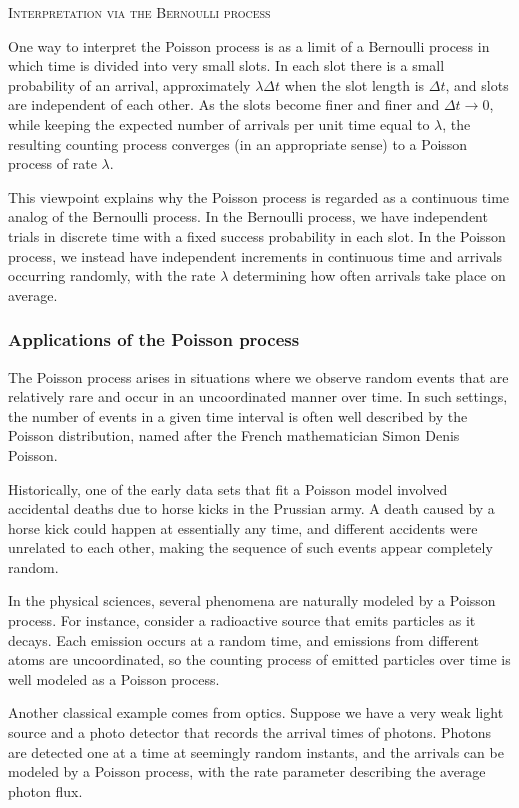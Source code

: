 \bigskip
\textsc{Interpretation via the Bernoulli process}

One way to interpret the Poisson process is as a limit of a Bernoulli process in which time is divided into very small slots.  
In each slot there is a small probability of an arrival, approximately \(\lambda \Delta t\) when the slot length is \(\Delta t\), and slots are independent of each other.  
As the slots become finer and finer and \(\Delta t \to 0\), while keeping the expected number of arrivals per unit time equal to \(\lambda\), the resulting counting process converges (in an appropriate sense) to a Poisson process of rate \(\lambda\).  

This viewpoint explains why the Poisson process is regarded as a continuous time analog of the Bernoulli process.  
In the Bernoulli process, we have independent trials in discrete time with a fixed success probability in each slot.  
In the Poisson process, we instead have independent increments in continuous time and arrivals occurring randomly, with the rate \(\lambda\) determining how often arrivals take place on average.

\subsubsection{Applications of the Poisson process}

The Poisson process arises in situations where we observe random events that are relatively rare and occur in an uncoordinated manner over time.  
In such settings, the number of events in a given time interval is often well described by the Poisson distribution, named after the French mathematician Simon Denis Poisson.  

Historically, one of the early data sets that fit a Poisson model involved accidental deaths due to horse kicks in the Prussian army.  
A death caused by a horse kick could happen at essentially any time, and different accidents were unrelated to each other, making the sequence of such events appear completely random.  

In the physical sciences, several phenomena are naturally modeled by a Poisson process.  
For instance, consider a radioactive source that emits particles as it decays.  
Each emission occurs at a random time, and emissions from different atoms are uncoordinated, so the counting process of emitted particles over time is well modeled as a Poisson process.  

Another classical example comes from optics.  
Suppose we have a very weak light source and a photo detector that records the arrival times of photons.  
Photons are detected one at a time at seemingly random instants, and the arrivals can be modeled by a Poisson process, with the rate parameter describing the average photon flux.  

